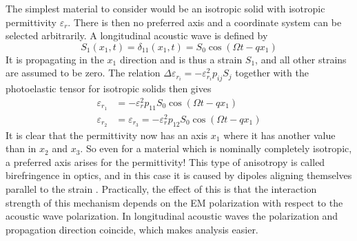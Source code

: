 \documentclass[10pt,a4paper,draft]{scrartcl}
\begin{document}
	The simplest material to consider would be an isotropic solid with isotropic permittivity $\varepsilon_r$. There is then no preferred axis and a coordinate system can be selected arbitrarily. A longitudinal acoustic wave is defined by \begin{equation*}
	S_1(x_1,t) = \delta_{11}(x_1,t) = S_0 \cos(\Omega t - qx_1)
	\end{equation*}
	It is propagating in the $x_1$ direction and is thus a strain $S_1$, and all other strains are assumed to be zero. The relation $\Delta \varepsilon_{r_i} = -\varepsilon_{r_i}^2 p_{ij} S_j$ together with the photoelastic tensor for isotropic solids then gives
	\begin{align*}
	\varepsilon_{r_1} &= -\varepsilon_r^2 p_{11} S_0 \cos(\Omega t - qx_1) \\
	\varepsilon_{r_2} &= \varepsilon_{r_3} = -\varepsilon_r^2 p_{12} S_0 \cos(\Omega t - qx_1)
	\end{align*}
	It is clear that the permittivity now has an axis $x_1$ where it has another value than in $x_2$ and $x_3$. So even for a material which is nominally completely isotropic, a preferred axis arises for the permittivity! This type of anisotropy is called birefringence in optics, and in this case it is caused by dipoles aligning themselves parallel to the strain \cite{Korpel1988}. Practically, the effect of this is that the interaction strength of this mechanism depends on the EM polarization with respect to the acoustic wave polarization. In longitudinal acoustic waves the polarization and propagation direction coincide, which makes analysis easier.
	
\end{document}
